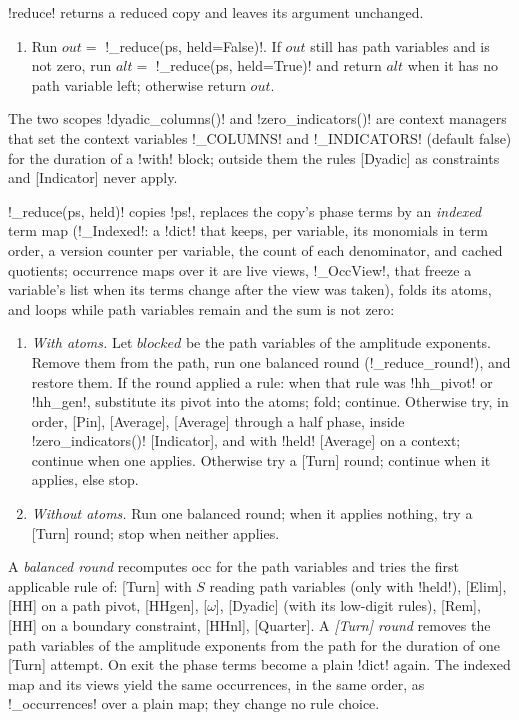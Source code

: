 \begin{algorithm}\label{alg:algebra-reduce}
\py!reduce! returns a reduced copy and leaves its argument unchanged.
\begin{enumerate}
\item Run $\mathit{out}=$ \py!_reduce(ps, held=False)!. If $\mathit{out}$ still has path variables and is not zero, run $\mathit{alt}=$ \py!_reduce(ps, held=True)! and return $\mathit{alt}$ when it has no path variable left; otherwise return $\mathit{out}$.
\end{enumerate}
The two scopes \py!dyadic_columns()! and \py!zero_indicators()! are context managers that set the context variables \py!_COLUMNS! and \py!_INDICATORS! (default false) for the duration of a \py!with! block; outside them the rules [Dyadic] as constraints and [Indicator] never apply.

\py!_reduce(ps, held)! copies \code!ps!, replaces the copy's phase terms by an \emph{indexed} term map (\py!_Indexed!: a \py!dict! that keeps, per variable, its monomials in term order, a version counter per variable, the count of each denominator, and cached quotients; occurrence maps over it are live views, \py!_OccView!, that freeze a variable's list when its terms change after the view was taken), folds its atoms, and loops while path variables remain and the sum is not zero:
\begin{enumerate}
\item \emph{With atoms.} Let $\mathit{blocked}$ be the path variables of the amplitude exponents. Remove them from the path, run one balanced round (\py!_reduce_round!), and restore them. If the round applied a rule: when that rule was \code!hh_pivot! or \code!hh_gen!, substitute its pivot into the atoms; fold; continue. Otherwise try, in order, [Pin], [Average], [Average] through a half phase, inside \py!zero_indicators()! [Indicator], and with \code!held! [Average] on a context; continue when one applies. Otherwise try a [Turn] round; continue when it applies, else stop.
\item \emph{Without atoms.} Run one balanced round; when it applies nothing, try a [Turn] round; stop when neither applies.
\end{enumerate}
A \emph{balanced round} recomputes $\mathrm{occ}$ for the path variables and tries the first applicable rule of: [Turn] with $S$ reading path variables (only with \code!held!), [Elim], [HH] on a path pivot, [HHgen], [$\omega$], [Dyadic] (with its low-digit rules), [Rem], [HH] on a boundary constraint, [HHnl], [Quarter]. A \emph{[Turn] round} removes the path variables of the amplitude exponents from the path for the duration of one [Turn] attempt. On exit the phase terms become a plain \py!dict! again. The indexed map and its views yield the same occurrences, in the same order, as \py!_occurrences! over a plain map; they change no rule choice.
\end{algorithm}

